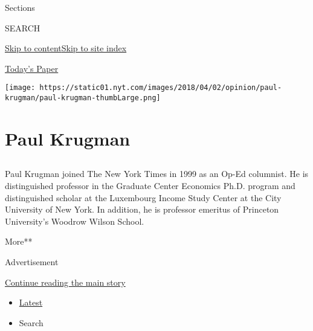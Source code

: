Sections

SEARCH

\protect\hyperlink{site-content}{Skip to
content}\protect\hyperlink{site-index}{Skip to site index}

\href{https://myaccount.nytimes.com/auth/login?response_type=cookie\&client_id=vi}{}

\href{https://www.nytimes.com/section/todayspaper}{Today's Paper}

\texttt{[image: https://static01.nyt.com/images/2018/04/02/opinion/paul-krugman/paul-krugman-thumbLarge.png]}

\hypertarget{paul-krugman}{%
\section{Paul Krugman}\label{paul-krugman}}

\subsection{}

Paul Krugman joined The New York Times in 1999 as an Op-Ed columnist. He
is distinguished professor in the Graduate Center Economics Ph.D.
program and distinguished scholar at the Luxembourg Income Study Center
at the City University of New York. In addition, he is professor
emeritus of Princeton University's Woodrow Wilson School.

More**

Advertisement

\protect\hyperlink{after-mid1}{Continue reading the main story}

\begin{itemize}
\tightlist
\item
  \protect\hyperlink{stream-panel}{Latest}
\item
  Search
\end{itemize}


